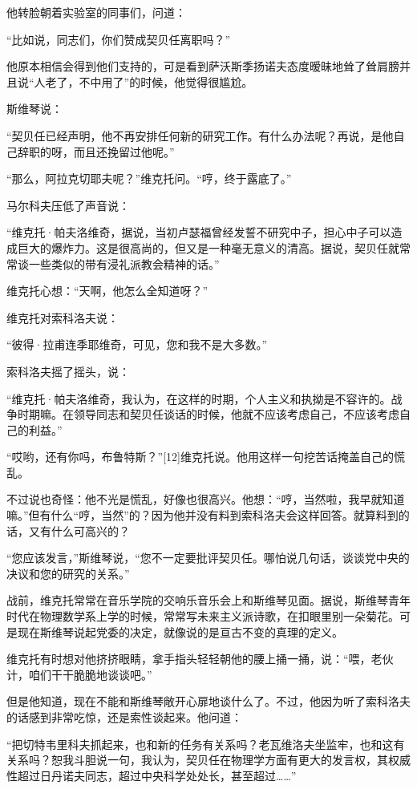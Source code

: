 他转脸朝着实验室的同事们，问道：

“比如说，同志们，你们赞成契贝任离职吗？”

他原本相信会得到他们支持的，可是看到萨沃斯季扬诺夫态度暧昧地耸了耸肩膀并且说“人老了，不中用了”的时候，他觉得很尴尬。

斯维琴说：

“契贝任已经声明，他不再安排任何新的研究工作。有什么办法呢？再说，是他自己辞职的呀，而且还挽留过他呢。”

“那么，阿拉克切耶夫呢？”维克托问。“哼，终于露底了。”

马尔科夫压低了声音说：

“维克托·帕夫洛维奇，据说，当初卢瑟福曾经发誓不研究中子，担心中子可以造成巨大的爆炸力。这是很高尚的，但又是一种毫无意义的清高。据说，契贝任就常常谈一些类似的带有浸礼派教会精神的话。”

维克托心想：“天啊，他怎么全知道呀？”

维克托对索科洛夫说：

“彼得·拉甫连季耶维奇，可见，您和我不是大多数。”

索科洛夫摇了摇头，说：

“维克托·帕夫洛维奇，我认为，在这样的时期，个人主义和执拗是不容许的。战争时期嘛。在领导同志和契贝任谈话的时候，他就不应该考虑自己，不应该考虑自己的利益。”

“哎哟，还有你吗，布鲁特斯？”[12]维克托说。他用这样一句挖苦话掩盖自己的慌乱。

不过说也奇怪：他不光是慌乱，好像也很高兴。他想：“哼，当然啦，我早就知道嘛。”但有什么“哼，当然”的？因为他并没有料到索科洛夫会这样回答。就算料到的话，又有什么可高兴的？

“您应该发言，”斯维琴说，“您不一定要批评契贝任。哪怕说几句话，谈谈党中央的决议和您的研究的关系。”

战前，维克托常常在音乐学院的交响乐音乐会上和斯维琴见面。据说，斯维琴青年时代在物理数学系上学的时候，常常写未来主义派诗歌，在扣眼里别一朵菊花。可是现在斯维琴说起党委的决定，就像说的是亘古不变的真理的定义。

维克托有时想对他挤挤眼睛，拿手指头轻轻朝他的腰上捅一捅，说：“喂，老伙计，咱们干干脆脆地谈谈吧。”

但是他知道，现在不能和斯维琴敞开心扉地谈什么了。不过，他因为听了索科洛夫的话感到非常吃惊，还是索性谈起来。他问道：

“把切特韦里科夫抓起来，也和新的任务有关系吗？老瓦维洛夫坐监牢，也和这有关系吗？恕我斗胆说一句，我认为，契贝任在物理学方面有更大的发言权，其权威性超过日丹诺夫同志，超过中央科学处处长，甚至超过……”

